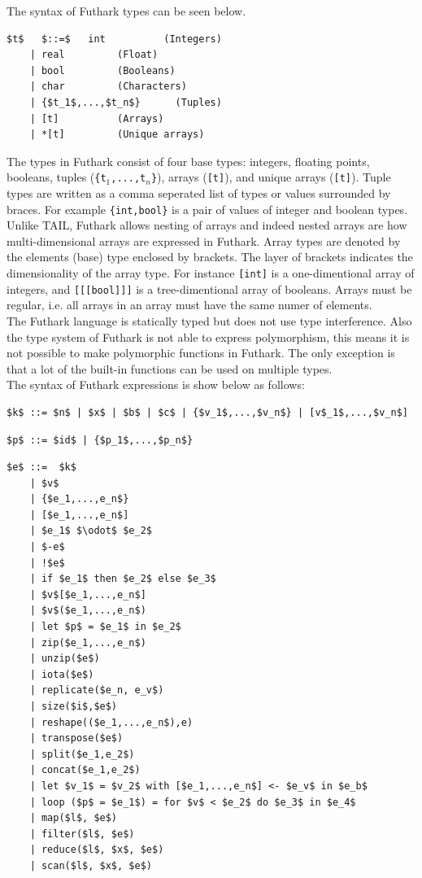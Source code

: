 \documentclass[11pt]{article}
\begin{document}
The syntax of Futhark types can be seen below.
\begin{lstlisting}[numbers=none,frame=none]
$t$   $::=$   int          (Integers)
    | real         (Float)
    | bool         (Booleans)
    | char         (Characters)
    | {$t_1$,...,$t_n$}      (Tuples)
    | [t]          (Arrays)
    | *[t]         (Unique arrays)
\end{lstlisting}
The types in Futhark consist of four base types: integers, floating points, booleans, tuples ({\tt \{t$_1$,...,t$_n$\}}), arrays ({\tt [t]}), and unique arrays ({\tt *[t]}).
Tuple types are written as a comma seperated list of types or values surrounded by braces. For example {\tt\{int,bool\}} is 
a pair of values of integer and boolean types.
Unlike TAIL, Futhark allows nesting of arrays and indeed nested arrays are how multi-dimensional arrays are expressed in Futhark.
Array types are denoted by the elements (base) type enclosed by brackets.
The layer of brackets indicates the dimensionality of the array type.
For instance {\tt [int]} is a one-dimentional array of integers, and {\tt [[[bool]]]} is a tree-dimentional array of booleans.
Arrays must be regular, i.e. all arrays in an array must have the same numer of elements. \\

The Futhark language is statically typed but does not use type interference. Also the type system of Futhark is not 
able to express polymorphism, this means it is not possible to make polymorphic functions in Futhark.
The only exception is that a lot of the built-in functions can be used on multiple types.\\

The syntax of Futhark expressions is show below as follows:
\begin{lstlisting}[numbers=none,frame=none]
$k$ ::= $n$ | $x$ | $b$ | $c$ | {$v_1$,...,$v_n$} | [v$_1$,...,$v_n$] 
\end{lstlisting}
\begin{lstlisting}[numbers=none,frame=none]
$p$ ::= $id$ | {$p_1$,...,$p_n$}
\end{lstlisting}

\begin{lstlisting}[numbers=none,frame=none]
$e$ ::=  $k$
    | $v$ 
    | {$e_1,...,e_n$} 
    | [$e_1,...,e_n$] 
    | $e_1$ $\odot$ $e_2$ 
    | $-e$ 
    | !$e$ 
    | if $e_1$ then $e_2$ else $e_3$ 
    | $v$[$e_1,...,e_n$] 
    | $v$($e_1,...,e_n$) 
    | let $p$ = $e_1$ in $e_2$
    | zip($e_1,...,e_n$) 
    | unzip($e$)
    | iota($e$) 
    | replicate($e_n, e_v$) 
    | size($i$,$e$) 
    | reshape(($e_1,...,e_n$),e)
    | transpose($e$)
    | split($e_1,e_2$)
    | concat($e_1,e_2$)
    | let $v_1$ = $v_2$ with [$e_1,...,e_n$] <- $e_v$ in $e_b$
    | loop ($p$ = $e_1$) = for $v$ < $e_2$ do $e_3$ in $e_4$
    | map($l$, $e$)
    | filter($l$, $e$)
    | reduce($l$, $x$, $e$)
    | scan($l$, $x$, $e$)
\end{lstlisting}
\end{document}

